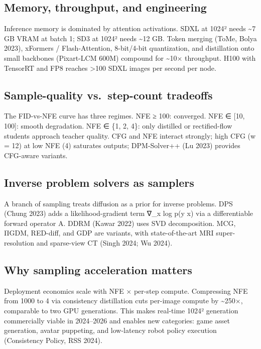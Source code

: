 \subsection{Memory, throughput, and engineering}\label{memory-throughput-and-engineering}

Inference memory is dominated by attention activations. SDXL at 1024² needs \textasciitilde7 GB VRAM at batch 1; SD3 at 1024² needs \textasciitilde12 GB. Token merging (ToMe, Bolya 2023), xFormers / Flash-Attention, 8-bit/4-bit quantization, and distillation onto small backbones (Pixart-LCM 600M) compound for \textasciitilde10× throughput. H100 with TensorRT and FP8 reaches \textgreater100 SDXL images per second per node.

\subsection{Sample-quality vs.~step-count tradeoffs}\label{sample-quality-vs.-step-count-tradeoffs}

The FID-vs-NFE curve has three regimes. NFE ≥ 100: converged. NFE ∈ {[}10, 100{]}: smooth degradation. NFE ∈ \{1, 2, 4\}: only distilled or rectified-flow students approach teacher quality. CFG and NFE interact strongly; high CFG (w = 12) at low NFE (4) saturates outputs; DPM-Solver++ (Lu 2023) provides CFG-aware variants.

\subsection{Inverse problem solvers as samplers}\label{inverse-problem-solvers-as-samplers}

A branch of sampling treats diffusion as a prior for inverse problems. DPS (Chung 2023) adds a likelihood-gradient term ∇\_x log p(y \textbar{} x) via a differentiable forward operator A. DDRM (Kawar 2022) uses SVD decomposition. MCG, ΠGDM, RED-diff, and GDP are variants, with state-of-the-art MRI super-resolution and sparse-view CT (Singh 2024; Wu 2024).

\subsection{Why sampling acceleration matters}\label{why-sampling-acceleration-matters}

Deployment economics scale with NFE × per-step compute. Compressing NFE from 1000 to 4 via consistency distillation cuts per-image compute by \textasciitilde250×, comparable to two GPU generations. This makes real-time 1024² generation commercially viable in 2024--2026 and enables new categories: game asset generation, avatar puppeting, and low-latency robot policy execution (Consistency Policy, RSS 2024).

